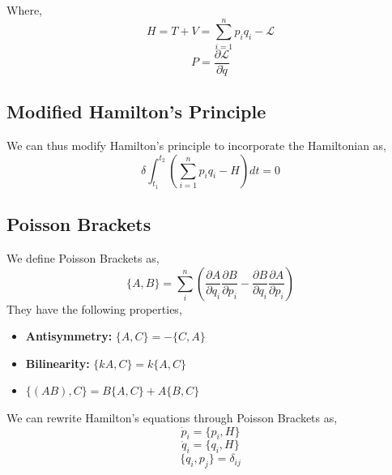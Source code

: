 	Where,
	$$H = T + V = \sum_{i = 1}^{n} p_{i}q_{i} - \mathcal{L}$$
	$$P = \frac{\partial \mathcal{L}}{\partial \dot{q}}$$
\subsection{Modified Hamilton's Principle}
We can thus modify Hamilton's principle to incorporate the Hamiltonian as,
\begin{equation}
\delta \int_{t_{1}}^{t_{2}} \left(\sum_{i = 1}^{n} p_{i}q_{i} - H \right) dt = 0 
\end{equation}
\subsection{Poisson Brackets}
We define Poisson Brackets as,
		\begin{equation}
		\{A, B\} = \sum_{i}^{n} \left( \frac{\partial A}{\partial q_{i}} \frac{\partial B}{\partial p_{i}} -  \frac{\partial B}{\partial q_{i}} \frac{\partial A}{\partial p_{i}}\right)
		\end{equation}
		They have the following properties,
		\begin{itemize}
		\item \textbf{Antisymmetry:} $\{A, C\} = -  \{C, A\}$
		\item \textbf{Bilinearity:} $\{kA, C\} = k \{A, C\}$
		\item $\{\left(AB\right), C\} = B\{A,C\} + A\{B,C\}$
		\end{itemize}
		
		We can rewrite Hamilton's equations through Poisson Brackets as,
		\begin{equation}
		\dot{p}_{i} = \{p_{i}, H\}
		\end{equation}
		\begin{equation}
		\dot{q}_{i} = \{q_{i}, H\}
		\end{equation}
		\begin{equation}
			\{q_{i}, p_{j}\} = \delta_{ij}
		\end{equation}
